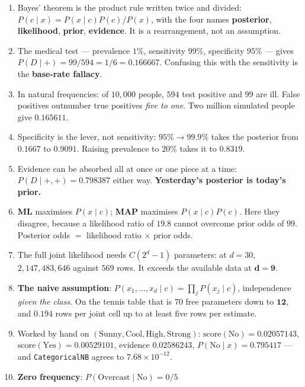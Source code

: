 \documentclass[11pt]{article}
\begin{document}
\begin{enumerate}[leftmargin=*]
  \item Bayes' theorem is the product rule written twice and divided:
    $P(c \mid x) = P(x \mid c)P(c)/P(x)$, with the four names
    \textbf{posterior}, \textbf{likelihood}, \textbf{prior},
    \textbf{evidence}. It is a rearrangement, not an assumption.
  \item The medical test --- prevalence $1\%$, sensitivity $99\%$,
    specificity $95\%$ --- gives $P(D \mid +) = 99/594 = 1/6 =
    \mathbf{0.166667}$. Confusing this with the sensitivity is the
    \textbf{base-rate fallacy}.
  \item In natural frequencies: of $10{,}000$ people, $594$ test positive and
    $99$ are ill. False positives outnumber true positives \emph{five to
    one}. Two million simulated people give $0.165611$.
  \item Specificity is the lever, not sensitivity: $95\% \to 99.9\%$ takes
    the posterior from $0.1667$ to $0.9091$. Raising prevalence to $20\%$
    takes it to $0.8319$.
  \item Evidence can be absorbed all at once or one piece at a time:
    $P(D \mid +,+) = 0.798387$ either way. \textbf{Yesterday's posterior is
    today's prior.}
  \item \textbf{ML} maximises $P(x \mid c)$; \textbf{MAP} maximises
    $P(x \mid c)P(c)$. Here they disagree, because a likelihood ratio of
    $19.8$ cannot overcome prior odds of $99$. Posterior odds $=$ likelihood
    ratio $\times$ prior odds.
  \item The full joint likelihood needs $C(2^d - 1)$ parameters: at $d = 30$,
    $2{,}147{,}483{,}646$ against $569$ rows. It exceeds the available data at
    $\mathbf{d = 9}$.
  \item \textbf{The naive assumption}: $P(x_1,\ldots,x_d \mid c) =
    \prod_j P(x_j \mid c)$, independence \emph{given the class}. On the
    tennis table that is $70$ free parameters down to $\mathbf{12}$, and
    $0.194$ rows per joint cell up to at least five rows per estimate.
  \item Worked by hand on $(\text{Sunny},\text{Cool},\text{High},
    \text{Strong})$: $\text{score}(\text{No}) = 0.02057143$,
    $\text{score}(\text{Yes}) = 0.00529101$, evidence $0.02586243$,
    $P(\text{No} \mid x) = \mathbf{0.795417}$ ---
    and \texttt{CategoricalNB} agrees to $7.68 \times 10^{-12}$.
  \item \textbf{Zero frequency}: $P(\text{Overcast} \mid \text{No}) = 0/5$

\end{enumerate}
\end{document}
